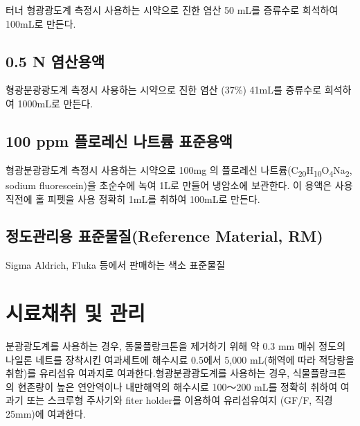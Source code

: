 \documentclass[
]{book}
\begin{document}
터너 형광광도계 측정시 사용하는 시약으로 진한 염산 50 mL를 증류수로 희석하여 100mL로 만든다.

\hypertarget{n-uxc5fcuxc0b0uxc6a9uxc561}{%
\subsection{0.5 N 염산용액}\label{n-uxc5fcuxc0b0uxc6a9uxc561}}

형광분광광도계 측정시 사용하는 시약으로 진한 염산 (37\%) 41mL를 증류수로 희석하여 1000mL로 만든다.

\hypertarget{ppm-uxd50cuxb85cuxb808uxc2e0-uxb098uxd2b8uxb968-uxd45cuxc900uxc6a9uxc561}{%
\subsection{100 ppm 플로레신 나트륨 표준용액}\label{ppm-uxd50cuxb85cuxb808uxc2e0-uxb098uxd2b8uxb968-uxd45cuxc900uxc6a9uxc561}}

형광분광광도계 측정시 사용하는 시약으로 100mg 의 플로레신 나트륨(C\textsubscript{20}H\textsubscript{10}O\textsubscript{4}Na\textsubscript{2}, sodium fluorescein)을 초순수에 녹여 1L로 만들어 냉암소에 보관한다. 이 용액은 사용직전에 홀 피펫을 사용 정확히 1mL를 취하여 100mL로 만든다.

\hypertarget{uxc815uxb3c4uxad00uxb9acuxc6a9-uxd45cuxc900uxbb3cuxc9c8reference-material-rm}{%
\subsection{정도관리용 표준물질(Reference Material, RM)}\label{uxc815uxb3c4uxad00uxb9acuxc6a9-uxd45cuxc900uxbb3cuxc9c8reference-material-rm}}

Sigma Aldrich, Fluka 등에서 판매하는 색소 표준물질

\hypertarget{uxc2dcuxb8ccuxcc44uxcde8-uxbc0f-uxad00uxb9ac-1}{%
\section{시료채취 및 관리}\label{uxc2dcuxb8ccuxcc44uxcde8-uxbc0f-uxad00uxb9ac-1}}

분광광도계를 사용하는 경우, 동물플랑크톤을 제거하기 위해 약 0.3 mm 매쉬 정도의 나일론 네트를 장착시킨 여과세트에 해수시료 0.5에서 5,000 mL(해역에 따라 적당량을 취함)를 유리섬유 여과지로 여과한다.형광분광광도계를 사용하는 경우, 식물플랑크톤의 현존량이 높은 연안역이나 내만해역의 해수시료 100～200 mL를 정확히 취하여 여과기 또는 스크루형 주사기와 fiter holder를 이용하여 유리섬유여지 (GF/F, 직경 25mm)에 여과한다.
\end{document}
